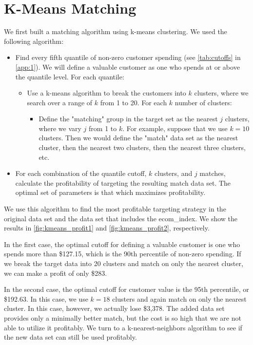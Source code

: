 \section{K-Means Matching}

We first built a matching algorithm using k-means clustering. We used the following algorithm:
\begin{itemize}
\item Find every fifth quantile of non-zero customer spending (see \cref{tab:cutoffs} in \vref{app:1}). We will define a valuable customer as one who spends at or above the quantile level. For each quantile:
\begin{itemize}
\item Use a k-means algorithm to break the customers into $k$ clusters, where we search over a range of $k$ from 1 to 20. For each $k$ number of clusters:
\begin{itemize}
\item Define the "matching" group in the target set as the nearest $j$ clusters, where we vary $j$ from 1 to $k$. For example, suppose that we use $k=10$ clusters. Then we would define the "match" data set as the nearest cluster, then the nearest two clusters, then the nearest three clusters, etc.
\end{itemize}
\end{itemize}
\item For each combination of the quantile cutoff, $k$ clusters, and $j$ matches, calculate the profitability of targeting the resulting match data set. The optimal set of parameters is that which maximizes profitability.
\end{itemize}
We use this algorithm to find the most profitable targeting strategy in the original data set and the data set that includes the ecom\_index. We show the results in \cref{fig:kmeans_profit1} and \cref{fig:kmeans_profit2}, respectively.

In the first case, the optimal cutoff for defining a valuable customer is one who spends more than \$127.15, which is the 90th percentile of non-zero spending. If we break the target data into 20 clusters and match on only the nearest cluster, we can make a profit of only \$283.

In the second case, the optimal cutoff for customer value is the 95th percentile, or \$192.63. In this case, we use $k=18$ clusters and again match on only the nearest cluster. In this case, however, we actually lose \$3,378. The added data set provides only a minimally better match, but the cost is so high that we are not able to utilize it profitably. We turn to a k-nearest-neighbors algorithm to see if the new data set can still be used profitably.

